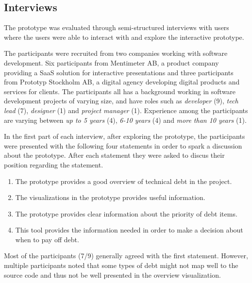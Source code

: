 \subsection{Interviews}

The prototype was evaluated through semi-structured interviews with users where the users were able to interact with and explore the interactive prototype.

The participants were recruited from two companies working with software development.
Six participants from Mentimeter AB, a product company providing a SaaS solution for interactive presentations and three participants from Prototyp Stockholm AB, a digital agency developing digital products and services for clients.
The participants all has a background working in software development projects of varying size, and have roles such as \textit{developer} (9), \textit{tech lead} (7), \textit{designer} (1) and \textit{project manager} (1).
Experience among the participants are varying between \textit{up to 5 years} (4), \textit{6-10 years} (4) and \textit{more than 10 years} (1).

In the first part of each interview, after exploring the prototype, the participants were presented with the following four statements in order to spark a discussion about the prototype.
After each statement they were asked to discus their position regarding the statement.

\smallskip
\begin{enumerate}
  \item The prototype provides a good overview of technical debt in the project.
  \item The visualizations in the prototype provides useful information.
  \item The prototype provides clear information about the priority of debt items.
  \item This tool provides the information needed in order to make a decision about when to pay off debt.
\end{enumerate}
\smallskip

Most of the participants (7/9) generally agreed with the first statement.
However, multiple participants noted that some types of debt might not map well to the source code and thus not be well presented in the overview visualization.


